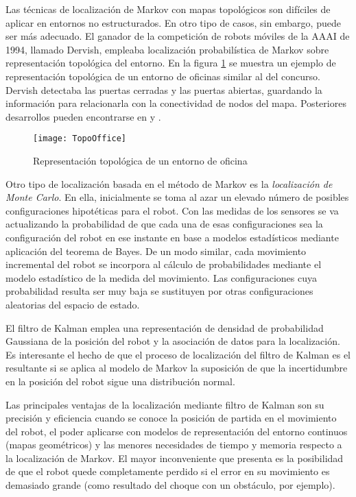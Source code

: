 Las técnicas de localización de Markov con mapas topológicos son difíciles de aplicar en entornos no estructurados. En otro tipo de casos, sin embargo, puede ser más adecuado. El ganador de la competición de robots móviles de la AAAI de 1994, llamado Dervish, empleaba localización probabilística de Markov sobre representación topológica del entorno. En la figura \ref{fg:MarkovTop} se muestra un ejemplo de representación topológica de un entorno de oficinas similar al del concurso. Dervish detectaba las puertas cerradas y las puertas abiertas, guardando la información para relacionarla con la conectividad de nodos del mapa. Posteriores desarrollos pueden encontrarse en \cite{Simmons95} y \cite{Kaebling96}.

\begin{figure}[h]
  \centering\texttt{[image: TopoOffice]}\\
  \caption{Representación topológica de un entorno de oficina}\label{fg:MarkovTop}
\end{figure}


Otro tipo de localización basada en el método de Markov es la \emph{ localización de Monte Carlo}. En ella, inicialmente se toma al azar  un elevado número de posibles configuraciones hipotéticas para el robot. Con las medidas de los sensores se va actualizando la probabilidad de que cada una de esas configuraciones sea la configuración del robot en ese instante en base a modelos estadísticos mediante aplicación del teorema de Bayes. De un modo similar, cada movimiento incremental del robot se incorpora al cálculo de probabilidades mediante el modelo estadístico de la medida del movimiento. Las configuraciones cuya probabilidad resulta ser muy baja se sustituyen por otras configuraciones aleatorias del espacio de estado.

El filtro de Kalman emplea una representación de densidad de probabilidad Gaussiana de la posición del robot y la asociación de datos para la localización. Es interesante el hecho de que el proceso de localización del filtro de Kalman es el resultante si se aplica al modelo de Markov la suposición de que la incertidumbre en la posición del robot sigue una distribución normal.

Las principales ventajas de la localización mediante filtro de Kalman son su precisión y eficiencia cuando se conoce la posición de partida en el movimiento del robot, el poder aplicarse con modelos de representación del entorno continuos (mapas geométricos) y las menores necesidades de tiempo y memoria respecto a la localización de Markov. El mayor inconveniente que presenta es la posibilidad de que el robot quede completamente perdido si el error en su movimiento es demasiado grande (como resultado del choque con un obstáculo, por ejemplo).

